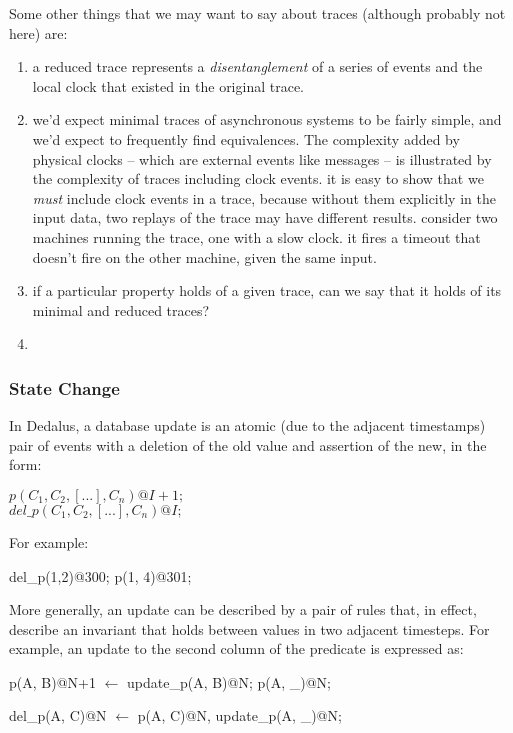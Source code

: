 Some other things that we may want to say about traces (although probably not here) are:
\begin{enumerate}
\item a reduced trace represents a \emph{disentanglement} of a series of events and the local clock that existed in the original trace.
\item we'd expect minimal traces of asynchronous systems to be fairly simple, and we'd expect to frequently find equivalences.
The complexity added by physical clocks -- which are external events like messages -- is illustrated by the complexity of traces including
clock events.  it is easy to show that we \emph{must} include clock events in a trace, because without them explicitly in the input data, two
replays of the trace may have different results.  consider two machines running the trace, one with a slow clock.  it fires a timeout that 
doesn't fire on the other machine, given the same input.
\item if a particular property holds of a given trace, can we say that it holds of its minimal and reduced traces?
\item 

\end{enumerate}


\subsubsection{State Change}

In Dedalus, a database update is an atomic (due to the adjacent timestamps)
pair of events with a deletion of the old value and assertion of the new, in
the form:

$p(C_{1},C_{2},[...],C_{n})@I+1;$
\\
$del\_p(C_{1},C_{2},[...],C_{n})@I;$

For example:

\begin{Dedalus}
del\_p(1,2)@300; 
p(1, 4)@301;
\end{Dedalus}

More generally, an update can be described by a pair of rules that, in effect,
describe an invariant that holds between values in two adjacent timesteps.
For example, an update to the second column of the predicate  is
expressed as:

\begin{Dedalus}
p(A, B)@N+1 \(\leftarrow\)
  update_p(A, B)@N;
  p(A, _)@N;
  
del_p(A, C)@N \(\leftarrow\)
  p(A, C)@N,
  update_p(A, _)@N;
  
\end{Dedalus}

